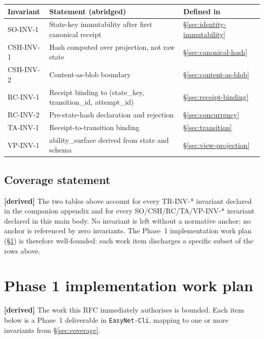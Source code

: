 \documentclass[11pt,a4paper]{article}
\newcommand{\derived}{\textcolor{derivedcolor}{\textbf{[derived]}}\xspace}
\theoremstyle{definition}
\begin{document}
\begin{center}
\renewcommand{\arraystretch}{1.25}
\begin{tabularx}{\linewidth}{l X l}
\toprule
\textbf{Invariant} & \textbf{Statement (abridged)} & \textbf{Defined in} \\
\midrule
SO-INV-1  & State-key immutability after first canonical receipt & \S\ref{sec:identity-immutability} \\
CSH-INV-1 & Hash computed over projection, not raw state         & \S\ref{sec:canonical-hash} \\
CSH-INV-2 & Content-as-blob boundary                             & \S\ref{sec:content-as-blob} \\
RC-INV-1  & Receipt binding to (state\_key, transition\_id, attempt\_id) & \S\ref{sec:receipt-binding} \\
RC-INV-2  & Pre-state-hash declaration and rejection             & \S\ref{sec:concurrency} \\
TA-INV-1  & Receipt-to-transition binding                        & \S\ref{sec:transition} \\
VP-INV-1  & ability\_surface derived from state and schema       & \S\ref{sec:view-projection} \\
\bottomrule
\end{tabularx}
\end{center}

\subsection{Coverage statement}

\derived{} The two tables above account for every TR-INV-*
invariant declared in the companion appendix and for every
SO/CSH/RC/TA/VP-INV-* invariant declared in this main body. No
invariant is left without a normative anchor; no anchor is
referenced by zero invariants. The Phase~1 implementation work
plan
(\S\ref{sec:phase1}) is therefore well-founded: each work item
discharges a specific subset of the rows above.

\section{Phase 1 implementation work plan}
\label{sec:phase1}

\derived{} The work this RFC immediately authorises is bounded.
Each item below is a Phase~1 deliverable in
\texttt{EasyNet-Cli}, mapping to one or more invariants from
\S\ref{sec:coverage}.
\end{document}

